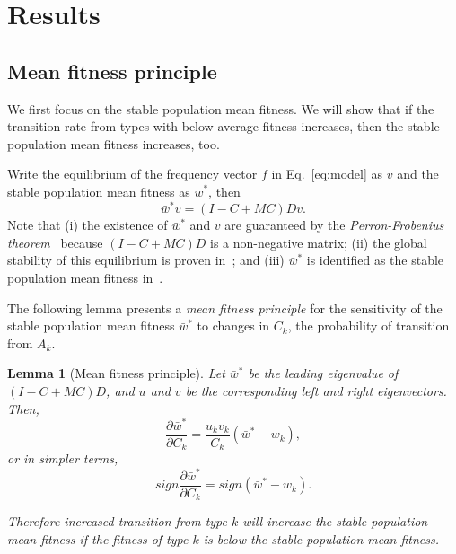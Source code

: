 \documentclass[9pt, a4paper, twocolumn]{extarticle}
\newtheorem{lemma}{Lemma}
\begin{document}
\section*{Results}

\subsection*{Mean fitness principle}

We first focus on the stable population mean fitness.
We will show that if the transition rate from types with below-average fitness increases, then the stable population mean fitness increases, too.


Write the equilibrium of the frequency vector $f$ in Eq.~\ref{eq:model} as $v$ and the stable population mean fitness as $\bar{w}^*$, then
\begin{equation}\label{eq:model_equilibrium}
\bar{w}^* v = (I-C+MC)D v.
\end{equation}
Note that (i) the existence of $\bar{w}^*$ and $v$ are guaranteed by the \emph{Perron-Frobenius theorem}~\cite[Appendix~A]{Otto2007} because $(I-C+MC)D$ is a non-negative matrix; 
(ii) the global stability of this equilibrium is proven in~; and
(iii) $\bar{w}^*$ is identified as the stable population mean fitness in~.

The following lemma presents a \emph{mean fitness principle} for the
sensitivity of the stable population mean fitness $\bar{w}^*$ to changes
in $C_k$, the probability of transition from $A_k$.

\begin{lemma}[Mean fitness principle]\label{lemma:mfp}
Let $\bar{w}^*$ be the leading eigenvalue of $(I-C+MC)D$,
and $u$ and $v$ be the corresponding left and right eigenvectors.
Then,
\begin{equation}\label{mfp}
\frac{\partial \bar{w}^*}{\partial C_k} = 
\frac{u_k v_k}{C_k} (\bar{w}^* - w_k),
\end{equation}
or in simpler terms,
\begin{equation}\label{mfp_sign}
sign\frac{\partial \bar{w}^*}{\partial C_k} = 
sign(\bar{w}^* - w_k).
\end{equation}

Therefore increased transition from type $k$ will increase the stable population mean fitness if the fitness of type $k$ is below the stable population mean fitness.
\end{lemma}
\end{document}
